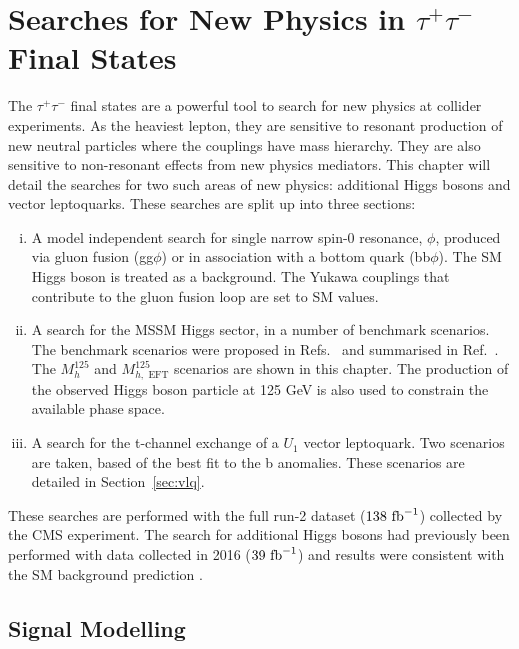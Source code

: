 \chapter{\texorpdfstring{Searches for New Physics in $\tau^+\tau^-$ Final States}{Search for new physics in tautau final states}}
\label{sec:bsm_H_to_tau_tau_analysis}
 
The $\tau^+\tau^-$ final states are a powerful tool to search for new physics at collider experiments. 
As the heaviest lepton, they are sensitive to resonant production of new neutral particles where the couplings have mass hierarchy.
They are also sensitive to non-resonant effects from new physics mediators. 
This chapter will detail the searches for two such areas of new physics: additional Higgs bosons and vector leptoquarks.
These searches are split up into three sections: 
\begin{enumerate}[i)]
  \item A model independent search for single narrow spin-0 resonance, $\phi$, produced via gluon fusion (gg$\phi$) or in association with a bottom quark (bb$\phi$). The SM Higgs boson is treated as a background. The Yukawa couplings that contribute to the gluon fusion loop are set to SM values.
   \item A search for the MSSM Higgs sector, in a number of benchmark scenarios. The benchmark scenarios were proposed in Refs.~\cite{Bahl:2018zmf,Bahl:2020kwe,Bahl:2019ago} and summarised in Ref.~\cite{Bagnaschi:2791954}. The $M_{h}^{125}$ and $M_{h,\text{ EFT}}^{125}$ scenarios are shown in this chapter. The production of the observed Higgs boson particle at 125 GeV is also used to constrain the available phase space.
  \item A search for the t-channel exchange of a $U_{1}$ vector leptoquark. Two scenarios are taken, based of the best fit to the b anomalies. These scenarios are detailed in Section~\ref{sec:vlq}.
\end{enumerate}

These searches are performed with the full run-2 dataset ($138 \text{ fb}^{-1}$) collected by the CMS experiment. 
The search for additional Higgs bosons had previously been performed with data collected in 2016 ($39 \text{ fb}^{-1}$) and results were consistent with the SM background prediction \cite{CMS_MSSM_Tau_2018}.
 
\section{Signal Modelling} 
 
